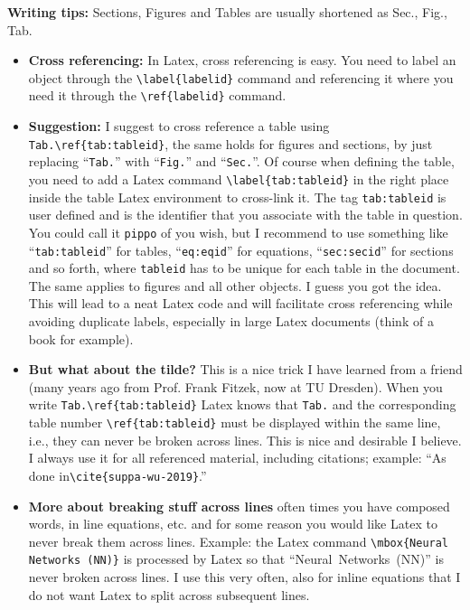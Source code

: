 \noindent \textbf{Writing tips:} Sections, Figures and Tables are usually shortened as Sec., Fig., Tab. 
\begin{itemize}
\item \textbf{Cross referencing:} In Latex, cross referencing is easy. You need to label an object through the \texttt{\textbackslash label\{labelid\}} command and referencing it where you need it through the \texttt{\textbackslash ref\{labelid\}} command. 
\item \textbf{Suggestion:} I suggest to cross reference a table using \texttt{Tab.\mytexttilde\textbackslash ref\{tab:tableid\}}, the same holds for figures and sections, by just replacing ``\texttt{Tab.}'' with ``\texttt{Fig.}'' and ``\texttt{Sec.}''. Of course when defining the table, you need to add a Latex command \texttt{\textbackslash label\{tab:tableid\}} in the right place inside the table Latex environment to \mbox{cross-link} it. The tag \texttt{tab:tableid} is user defined and is the identifier that you associate with the table in question. You could call it \texttt{pippo} of you wish, but I recommend to use something like ``\texttt{tab:tableid}'' for tables, ``\texttt{eq:eqid}'' for equations, ``\texttt{sec:secid}'' for sections and so forth, where \texttt{tableid} has to be unique for each table in the document. The same applies to figures and all other objects. I guess you got the idea. This will lead to a neat Latex code and will facilitate cross referencing while avoiding duplicate labels, especially in large Latex documents (think of a book for example). 
\item \textbf{But what about the tilde?} This is a nice trick I have learned from a friend (many years ago from Prof. Frank Fitzek, now at TU Dresden). When you write \texttt{Tab.\mytexttilde\textbackslash ref\{tab:tableid\}} Latex knows that \texttt{Tab.} and the corresponding table number \texttt{\textbackslash ref\{tab:tableid\}} must be displayed within the same line, i.e., they can never be broken across lines. This is nice and desirable I believe. I always use it for all referenced material, including citations; example: ``As done in\texttt{\mytexttilde\textbackslash cite\{suppa-wu-2019\}}.''
\item \textbf{More about breaking stuff across lines} often times you have composed words, in line equations, etc. and for some reason you would like Latex to never break them across lines. Example: the Latex command \texttt{\textbackslash mbox\{Neural Networks (NN)\}} is processed by Latex so that ``\mbox{Neural Networks (NN)}'' is never broken across lines. I use this very often, also for inline equations that I do not want Latex to split across subsequent lines.
\end{itemize}

